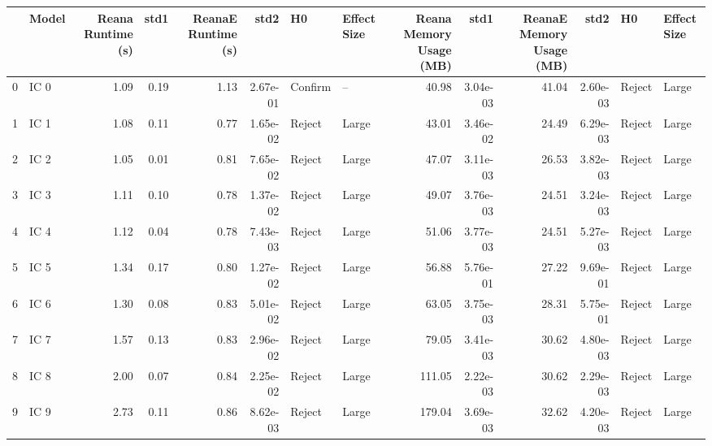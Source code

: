 \begin{tabular}{llrrrrllrrrrll}
\toprule
{} &  Model &  Reana Runtime (s) &   std1 &  ReanaE Runtime (s) &      std2 &       H0 & Effect Size &  Reana Memory Usage (MB) &      std1 &  ReanaE Memory Usage (MB) &      std2 &      H0 & Effect Size \\
\midrule
0  &   IC 0 &               1.09 &   0.19 &                1.13 &  2.67e-01 &  Confirm &          -- &                    40.98 &  3.04e-03 &                     41.04 &  2.60e-03 &  Reject &       Large \\
1  &   IC 1 &               1.08 &   0.11 &                0.77 &  1.65e-02 &   Reject &       Large &                    43.01 &  3.46e-02 &                     24.49 &  6.29e-03 &  Reject &       Large \\
2  &   IC 2 &               1.05 &   0.01 &                0.81 &  7.65e-02 &   Reject &       Large &                    47.07 &  3.11e-03 &                     26.53 &  3.82e-03 &  Reject &       Large \\
3  &   IC 3 &               1.11 &   0.10 &                0.78 &  1.37e-02 &   Reject &       Large &                    49.07 &  3.76e-03 &                     24.51 &  3.24e-03 &  Reject &       Large \\
4  &   IC 4 &               1.12 &   0.04 &                0.78 &  7.43e-03 &   Reject &       Large &                    51.06 &  3.77e-03 &                     24.51 &  5.27e-03 &  Reject &       Large \\
5  &   IC 5 &               1.34 &   0.17 &                0.80 &  1.27e-02 &   Reject &       Large &                    56.88 &  5.76e-01 &                     27.22 &  9.69e-01 &  Reject &       Large \\
6  &   IC 6 &               1.30 &   0.08 &                0.83 &  5.01e-02 &   Reject &       Large &                    63.05 &  3.75e-03 &                     28.31 &  5.75e-01 &  Reject &       Large \\
7  &   IC 7 &               1.57 &   0.13 &                0.83 &  2.96e-02 &   Reject &       Large &                    79.05 &  3.41e-03 &                     30.62 &  4.80e-03 &  Reject &       Large \\
8  &   IC 8 &               2.00 &   0.07 &                0.84 &  2.25e-02 &   Reject &       Large &                   111.05 &  2.22e-03 &                     30.62 &  2.29e-03 &  Reject &       Large \\
9  &   IC 9 &               2.73 &   0.11 &                0.86 &  8.62e-03 &   Reject &       Large &                   179.04 &  3.69e-03 &                     32.62 &  4.20e-03 &  Reject &       Large \\

\end{tabular}

